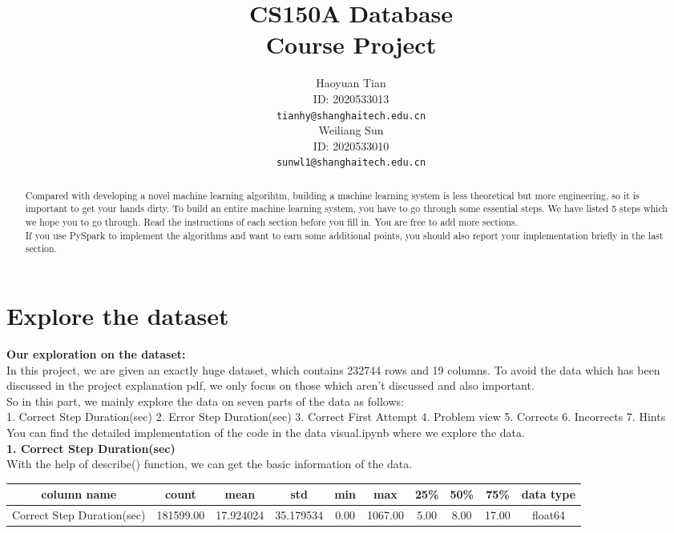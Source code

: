 \documentclass{article}
\title{CS150A Database \\Course Project}
\author{
  Haoyuan Tian\\
  ID: 2020533013\\
  \texttt{tianhy@shanghaitech.edu.cn} \\
   \And
  Weiliang Sun\\
  ID: 2020533010\\
  \texttt{sunwl1@shanghaitech.edu.cn}
}
\begin{document}

\maketitle

\begin{abstract}

  Compared with developing a novel machine learning algorihtm, building a machine learning system is less theoretical but more engineering, so it is important to get your hands dirty. To build an entire machine learning system, you have to go through some essential steps. We have listed 5 steps which we hope you to go through. Read the instructions of each section before you fill in. You are free to add more sections. \\
  If you use PySpark to implement the algorithms and want to earn some additional points, you should also report your implementation briefly in the last section.
\end{abstract}

\section{Explore the dataset}
\textbf{Our exploration on the dataset:}\\
In this project, we are given an exactly huge dataset, which contains 232744 rows and 19 columns. To avoid
the data which has been discussed in the project explanation pdf, we only focus on those which aren't discussed and also important.\\
So in this part, we mainly explore the data on seven parts of the data as follows: \\
1. Correct Step Duration(sec)
2. Error Step Duration(sec)
3. Correct First Attempt
4. Problem view
5. Corrects
6. Incorrects
7. Hints \\
You can find the detailed implementation of the code in the data visual.ipynb where we explore the data. \\
\textbf{1. Correct Step Duration(sec)}\\
With the help of describe() function, we can get the basic information of the data. \\
\begin{tabular}{|c|c|c|c|c|c|c|c|c|c|}
  \hline
  column name                & count     & mean      & std       & min  & max     & 25\% & 50\% & 75\%  & data type \\
  \hline
  Correct Step Duration(sec) & 181599.00 & 17.924024 & 35.179534 & 0.00 & 1067.00 & 5.00 & 8.00 & 17.00 & float64   \\
  \hline
\end{tabular}
\end{document}
